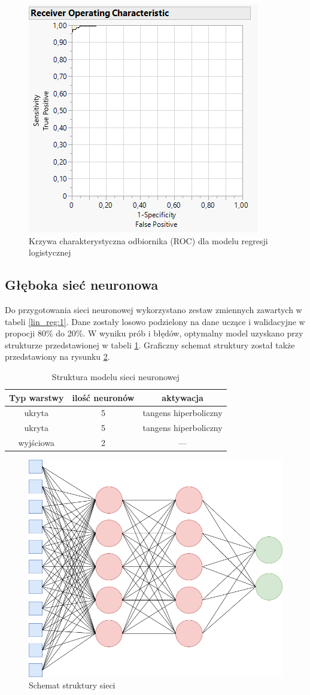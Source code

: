 \begin{figure}[!ht]
	\centering
	\includegraphics[width=0.5\linewidth]{Rysunki/Rozdzial3/roc}
	\caption{Krzywa charakterystyczna odbiornika (ROC) dla modelu regresji logistycznej}
	\label{fig:roc}
\end{figure}

\subsection{Głęboka sieć neuronowa}

Do przygotowania sieci neuronowej wykorzystano zestaw zmiennych zawartych w tabeli \ref{lin_reg:1}. Dane zostały losowo podzielony na dane uczące i walidacyjne w propocji 80\% do 20\%. W wyniku prób i błędów, optymalny model uzyskano przy strukturze przedstawionej w tabeli \ref{neural:1}. Graficzny schemat struktury został także przedstawiony na rysunku \ref{fig:neuralstruct}.

\begin{table}[!ht]
	\centering
	\begin{tabular}{c|c|c}
		Typ warstwy & ilość neuronów & aktywacja \\
		\hline
		ukryta & 5 & tangens hiperboliczny \\
		ukryta & 5 & tangens hiperboliczny \\
		wyjściowa & 2 & ---	
	\end{tabular}
	\caption{Struktura modelu sieci neuronowej}
	\label{neural:1}
\end{table}

\begin{figure}[!ht]
	\centering
	\includegraphics[width=0.6\linewidth]{Rysunki/Rozdzial3/neural_struct}
	\caption{Schemat struktury sieci}
	\label{fig:neuralstruct}
\end{figure}

